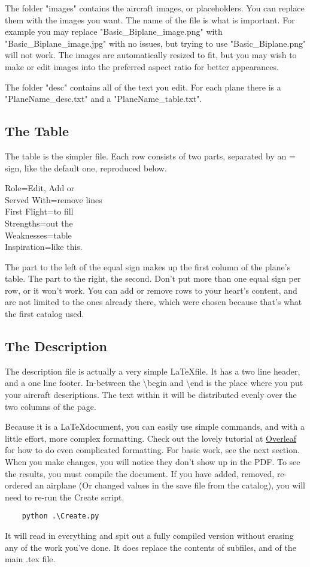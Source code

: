 \documentclass{article}
\begin{document}
The folder "images" contains the aircraft images, or placeholders.  You can replace them with the images you want.  The name of the file is what is important.  For example you may replace "Basic\_Biplane\_image.png" with "Basic\_Biplane\_image.jpg" with no issues, but trying to use "Basic\_Biplane.png" will not work.  The images are automatically resized to fit, but you may wish to make or edit images into the preferred aspect ratio for better appearances.

The folder "desc" contains all of the text you edit.  For each plane there is a "PlaneName\_desc.txt" and a "PlaneName\_table.txt".

\subsection{The Table}
The table is the simpler file.  Each row consists of two parts, separated by an = sign, like the default one, reproduced below.
\begin{displayquote}
    Role=Edit, Add or\\
    Served With=remove lines\\
    First Flight=to fill\\
    Strengths=out the\\
    Weaknesses=table\\
    Inspiration=like this.\\
\end{displayquote}
The part to the left of the equal sign makes up the first column of the plane's table.  The part to the right, the second.  Don't put more than one equal sign per row, or it won't work.  You can add or remove rows to your heart's content, and are not limited to the ones already there, which were chosen because that's what the first catalog used.

\subsection{The Description}
The description file is actually a very simple \LaTeX file.  It has a two line header, and a one line footer.  In-between the \textbackslash begin and \textbackslash end is the place where you put your aircraft descriptions.  The text within it will be distributed evenly over the two columns of the page.

Because it is a \LaTeX document, you can easily use simple commands, and with a little effort, more complex formatting.  Check out the lovely tutorial at \href{https://overleaf.com/learn/latex/Paragraphs_and_new_lines}{\color{blue}\underline{Overleaf}} for how to do even complicated formatting.  For basic work, see the next section.
When you make changes, you will notice they don't show up in the PDF.  To see the results, you must compile the document.  If you have added, removed, re-ordered an airplane (Or changed values in the save file from the catalog), you will need to re-run the Create script.
\begin{verbatim}
    python .\Create.py
\end{verbatim}
It will read in everything and spit out a fully compiled version without erasing any of the work you've done.  It does replace the contents of subfiles, and of the main .tex file.
\end{document}
